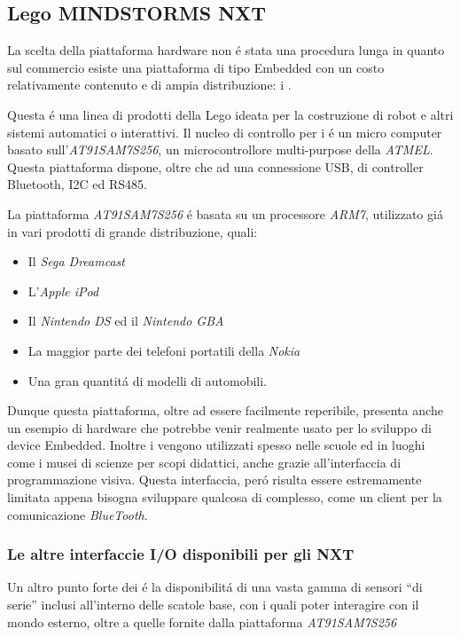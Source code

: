 \subsection{Lego MINDSTORMS NXT}
La scelta della piattaforma hardware non \'e stata una procedura lunga in
quanto sul commercio esiste una piattaforma di tipo Embedded con un costo
relativamente contenuto e di ampia distribuzione: i \nxt.

Questa \'e una linea di prodotti della Lego
ideata per la costruzione di robot e altri sistemi automatici o
interattivi.  Il nucleo di controllo per i
\nxt{} \'e un micro computer basato sull'\emph{AT91SAM7S256}, un
microcontrollore multi-purpose della \emph{ATMEL}. Questa piattaforma
dispone, oltre che ad una connessione USB, di controller Bluetooth, I2C ed
RS485.

La piattaforma \emph{AT91SAM7S256} \'e basata su un processore
\emph{ARM7}, utilizzato gi\'a in vari prodotti di grande distribuzione,
quali:
\begin{itemize}
    \item Il \emph{Sega Dreamcast}
    \item L'\emph{Apple iPod}
    \item Il \emph{Nintendo DS} ed il \emph{Nintendo GBA}
    \item La maggior parte dei telefoni portatili della \emph{Nokia}
    \item Una gran quantit\'a di modelli di automobili.
\end{itemize}
Dunque questa piattaforma, oltre ad essere facilmente reperibile, presenta
anche un esempio di hardware che potrebbe venir realmente usato per lo
sviluppo di device Embedded. Inoltre i \nxt{} vengono utilizzati spesso
nelle scuole ed in luoghi come i musei di scienze per scopi didattici,
anche grazie all'interfaccia di programmazione visiva. Questa interfaccia,
per\'o risulta essere estremamente limitata appena bisogna sviluppare
qualcosa di complesso, come un client per la comunicazione
\emph{BlueTooth}.

\subsubsection{Le altre interfaccie I/O disponibili per gli NXT}
Un altro punto forte dei \nxt{} \'e la disponibilit\'a di una vasta gamma
di sensori ``di serie'' inclusi all'interno delle scatole base, con i quali
poter interagire con il mondo esterno, oltre a quelle fornite dalla
piattaforma \emph{AT91SAM7S256} 

